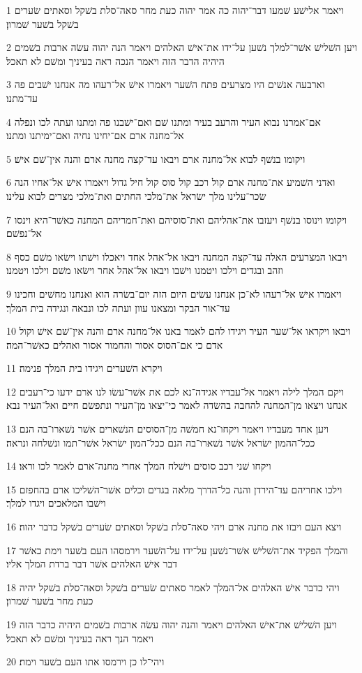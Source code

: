 \par 1 ויאמר אלישׁע שׁמעו דבר־יהוה כה אמר יהוה כעת מחר סאה־סלת בשׁקל וסאתים שׂערים בשׁקל בשׁער שׁמרון׃
\par 2 ויען השׁלישׁ אשׁר־למלך נשׁען על־ידו את־אישׁ האלהים ויאמר הנה יהוה עשׂה ארבות בשׁמים היהיה הדבר הזה ויאמר הנכה ראה בעיניך ומשׁם לא תאכל׃
\par 3 וארבעה אנשׁים היו מצרעים פתח השׁער ויאמרו אישׁ אל־רעהו מה אנחנו ישׁבים פה עד־מתנו׃
\par 4 אם־אמרנו נבוא העיר והרעב בעיר ומתנו שׁם ואם־ישׁבנו פה ומתנו ועתה לכו ונפלה אל־מחנה ארם אם־יחינו נחיה ואם־ימיתנו ומתנו׃
\par 5 ויקומו בנשׁף לבוא אל־מחנה ארם ויבאו עד־קצה מחנה ארם והנה אין־שׁם אישׁ׃
\par 6 ואדני השׁמיע את־מחנה ארם קול רכב קול סוס קול חיל גדול ויאמרו אישׁ אל־אחיו הנה שׂכר־עלינו מלך ישׂראל את־מלכי החתים ואת־מלכי מצרים לבוא עלינו׃
\par 7 ויקומו וינוסו בנשׁף ויעזבו את־אהליהם ואת־סוסיהם ואת־חמריהם המחנה כאשׁר־היא וינסו אל־נפשׁם׃
\par 8 ויבאו המצרעים האלה עד־קצה המחנה ויבאו אל־אהל אחד ויאכלו וישׁתו וישׂאו משׁם כסף וזהב ובגדים וילכו ויטמנו וישׁבו ויבאו אל־אהל אחר וישׂאו משׁם וילכו ויטמנו׃
\par 9 ויאמרו אישׁ אל־רעהו לא־כן אנחנו עשׂים היום הזה יום־בשׂרה הוא ואנחנו מחשׁים וחכינו עד־אור הבקר ומצאנו עוון ועתה לכו ונבאה ונגידה בית המלך׃
\par 10 ויבאו ויקראו אל־שׁער העיר ויגידו להם לאמר באנו אל־מחנה ארם והנה אין־שׁם אישׁ וקול אדם כי אם־הסוס אסור והחמור אסור ואהלים כאשׁר־המה׃
\par 11 ויקרא השׁערים ויגידו בית המלך פנימה׃
\par 12 ויקם המלך לילה ויאמר אל־עבדיו אגידה־נא לכם את אשׁר־עשׂו לנו ארם ידעו כי־רעבים אנחנו ויצאו מן־המחנה להחבה בהשׂדה לאמר כי־יצאו מן־העיר ונתפשׂם חיים ואל־העיר נבא׃
\par 13 ויען אחד מעבדיו ויאמר ויקחו־נא חמשׁה מן־הסוסים הנשׁארים אשׁר נשׁארו־בה הנם ככל־ההמון ישׂראל אשׁר נשׁארו־בה הנם ככל־המון ישׂראל אשׁר־תמו ונשׁלחה ונראה׃
\par 14 ויקחו שׁני רכב סוסים וישׁלח המלך אחרי מחנה־ארם לאמר לכו וראו׃
\par 15 וילכו אחריהם עד־הירדן והנה כל־הדרך מלאה בגדים וכלים אשׁר־השׁליכו ארם בהחפזם וישׁבו המלאכים ויגדו למלך׃
\par 16 ויצא העם ויבזו את מחנה ארם ויהי סאה־סלת בשׁקל וסאתים שׂערים בשׁקל כדבר יהוה׃
\par 17 והמלך הפקיד את־השׁלישׁ אשׁר־נשׁען על־ידו על־השׁער וירמסהו העם בשׁער וימת כאשׁר דבר אישׁ האלהים אשׁר דבר ברדת המלך אליו׃
\par 18 ויהי כדבר אישׁ האלהים אל־המלך לאמר סאתים שׂערים בשׁקל וסאה־סלת בשׁקל יהיה כעת מחר בשׁער שׁמרון׃
\par 19 ויען השׁלישׁ את־אישׁ האלהים ויאמר והנה יהוה עשׂה ארבות בשׁמים היהיה כדבר הזה ויאמר הנך ראה בעיניך ומשׁם לא תאכל׃
\par 20 ויהי־לו כן וירמסו אתו העם בשׁער וימת׃

